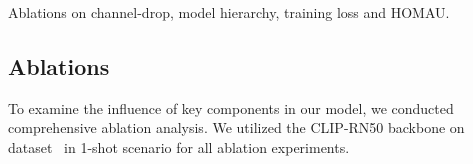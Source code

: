 \documentclass[lettersize,journal]{IEEEtran}
\begin{document}
\begin{table}
  \parbox{0.4\linewidth}{
  \centering
  \caption{Ablations on channel-drop, model hierarchy, training loss and HOMAU.}
  \label{tab:ablation_on_channel-drop_and_hierarchy_and_loss}
  }
  \hfill
  \parbox{0.5\linewidth}{
    \centering
    \caption{Ablation on switching backbone from CLIP to IN1K-pretrained.}
    \label{tab:ablation_backbone}
    }
\end{table}

\subsection{Ablations}

To examine the influence of key components in our model, we conducted comprehensive ablation analysis. We utilized the CLIP-RN50 backbone on  dataset~\cite{shaban2017one} in 1-shot scenario for all ablation experiments.
\end{document}
